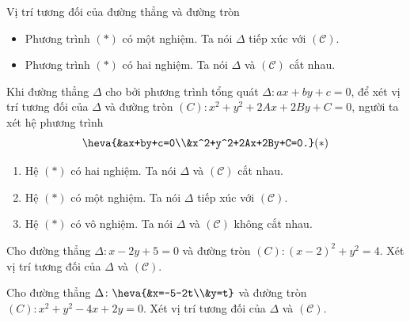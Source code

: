 \begin{dang}{Vị trí tương đối của đường thẳng và đường tròn}
\begin{note}
\begin{enumerate}
\begin{itemize}
				\item Phương trình $(\ast)$ có một nghiệm. Ta nói $\Delta$ tiếp xúc với $\mathcal{(C)}$.
				\item Phương trình $(\ast)$ có hai nghiệm. Ta nói $\Delta$ và $\mathcal{(C)}$ cắt nhau.
			\end{itemize}
		\end{enumerate}
	\end{note}
	\begin{note}
		Khi đường thẳng $\Delta$ cho bởi phương trình tổng quát $\Delta \colon ax+by+c=0$, để xét vị trí tương đối của $\Delta$ và đường tròn  $(C) \colon  x^2+y^2+2Ax+2By+C=0$, người ta xét hệ phương trình  $$\heva{&ax+by+c=0\\&x^2+y^2+2Ax+2By+C=0.} (\ast)$$
		\begin{enumerate}
			\item Hệ  $(\ast)$ có hai nghiệm. Ta nói $\Delta$ và $\mathcal{(C)}$ cắt nhau. 
			\item Hệ  $(\ast)$ có một nghiệm. Ta nói $\Delta$ tiếp xúc với $\mathcal{(C)}$.
			\item Hệ  $(\ast)$ có vô nghiệm. Ta nói $\Delta$ và $\mathcal{(C)}$ không cắt nhau.
		\end{enumerate}
	\end{note}
\end{dang}
\begin{vd}%
	Cho đường thẳng $\Delta \colon x-2y+5=0$ và đường tròn $(C) \colon  (x-2)^2+y^2=4$. Xét vị trí tương đối của $\Delta$ và $\mathcal{(C)}$.
\end{vd}
\begin{vd}%
	Cho đường thẳng $\Delta \colon \heva{&x=-5-2t\\&y=t}$ và đường tròn $(C) \colon  x^2+y^2-4x+2y=0$. Xét vị trí tương đối của $\Delta$ và $\mathcal{(C)}$.
\end{vd}
